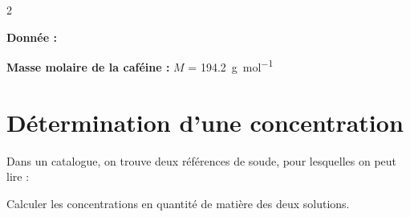 \documentclass[a4paper,11pt,fleqn]{article}%
\begin{document}
\begin{multicols}{2}
\noindent \colorbox{red!10}{
    \begin{minipage}{.95\linewidth}
    \textbf{Donnée :}
    \begin{itemize**}
        \item \textbf{Masse molaire de la caféine :} $M$ = \SI{194,2}{\gram\per\mole}
    \end{itemize**}
    \end{minipage}}

    \section{Détermination d'une concentration}
    Dans un catalogue, on trouve deux références de soude, pour lesquelles on peut lire :
    
    
    Calculer les concentrations en quantité de matière des deux solutions.
    

\end{multicols}
\end{document}
